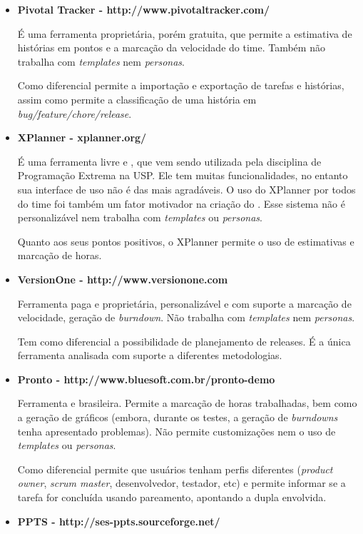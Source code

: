 \begin{itemize}
\item{\textbf{Pivotal Tracker - http://www.pivotaltracker.com/}

É uma ferramenta proprietária, porém gratuita, que permite a estimativa de histórias em pontos e a marcação da velocidade do time. Também não trabalha com \textit{templates} nem \textit{personas}. 

Como diferencial permite a importação e exportação de tarefas e histórias, assim como permite a classificação de uma história em \textit{bug/feature/chore/release}.}

\item{\textbf{XPlanner - xplanner.org/}

É uma ferramenta livre e \opensource{}, que vem sendo utilizada pela disciplina de Programação Extrema na USP. Ele tem muitas funcionalidades, no entanto sua interface de uso não é das mais agradáveis. O uso do XPlanner por todos do time foi também um fator motivador na criação do \calopsita{}. Esse sistema não é personalizável nem trabalha com \textit{templates} ou \textit{personas}.

Quanto aos seus pontos positivos, o XPlanner permite o uso de estimativas e marcação de horas.}

\item{\textbf{VersionOne - http://www.versionone.com}

Ferramenta paga  e proprietária, personalizável e com suporte a marcação de velocidade, geração de \textit{burndown}. Não trabalha com \textit{templates} nem \textit{personas}.

Tem como diferencial a possibilidade de planejamento de releases. É a única ferramenta analisada com suporte a diferentes metodologias.}

\item{\textbf{Pronto - http://www.bluesoft.com.br/pronto-demo}

Ferramenta \opensource{} e brasileira. Permite a marcação de horas trabalhadas, bem como a geração de gráficos (embora, durante os testes, a geração de \textit{burndowns} tenha apresentado problemas). Não permite customizações nem o uso de \textit{templates} ou \textit{personas}. 

Como diferencial permite que usuários tenham perfis diferentes (\textit{product owner}, \textit{scrum master}, desenvolvedor, testador, etc) e permite informar se a tarefa for concluída usando pareamento, apontando a dupla envolvida.}

\item{\textbf{PPTS - http://ses-ppts.sourceforge.net/}

}
\end{itemize}
